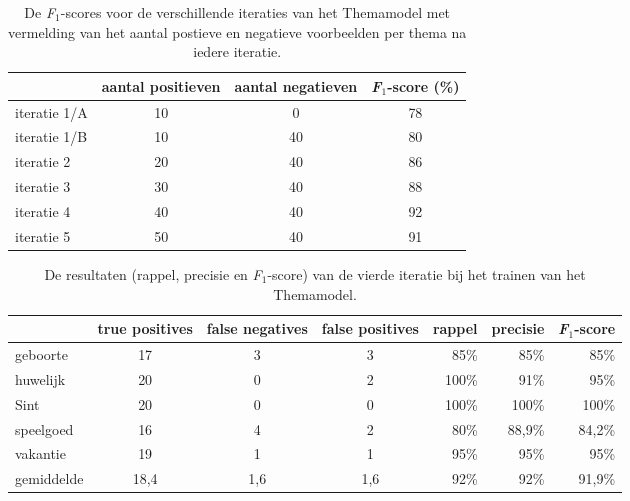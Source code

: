 \begin{table}
    \centering
    \renewcommand\arraystretch{1.2}
    \begin{tabular}{l|cc|c}
        \toprule
        & aantal positieven  &  aantal negatieven & \textit{F$_{1}$}-score (\%)\\
        \midrule
        iteratie 1/A & 10 & 0 & 78 \\
        iteratie 1/B & 10 & 40 & 80 \\
        iteratie 2 & 20 & 40 & 86 \\
        iteratie 3 & 30 & 40 & 88 \\
        iteratie 4 & 40 & 40 & 92 \\
        iteratie 5 & 50 & 40 & 91 \\
        \bottomrule
    \end{tabular}
    \caption[De \textit{F$_{1}$}-scores voor de verschillende iteraties van het Themamodel.]{De \textit{F$_{1}$}-scores voor de verschillende iteraties van het Themamodel met vermelding van het aantal postieve en negatieve voorbeelden per thema na iedere iteratie.}
    \label{tab:validatie-themamodel}
\end{table}


\begin{table}
    \centering
    \renewcommand\arraystretch{1.2}
    \begin{tabular}{l|ccc|rrr}
        \toprule
        & true positives  & false negatives & false positives & rappel & precisie & \textit{F$_{1}$}-score \\
        \midrule
        geboorte & 17 & 3 & 3 & 85\% & 85\% & 85\% \\
        huwelijk & 20 & 0 & 2 & 100\% & 91\% & 95\% \\
        Sint & 20 & 0 & 0 & 100\% & 100\% & 100\% \\
        speelgoed & 16 & 4 & 2 & 80\% & 88,9\% & 84,2\% \\
        vakantie & 19 & 1 & 1 & 95\% & 95\% & 95\% \\
        \midrule
        gemiddelde & 18,4 & 1,6 & 1,6 & 92\% & 92\% & 91,9\% \\
        \bottomrule
    \end{tabular}
    \caption{De resultaten (rappel, precisie en \textit{F$_{1}$}-score) van de vierde iteratie bij het trainen van het Themamodel.}
    \label{tab:validatie-iteratie4-themamodel}
\end{table}

